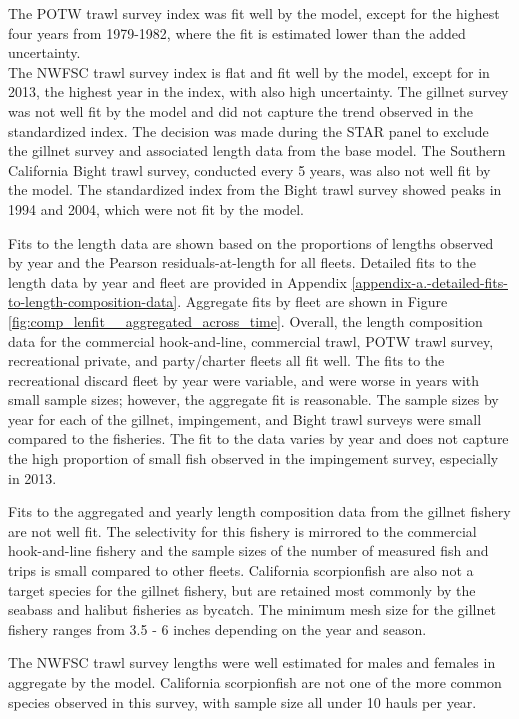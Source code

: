 \documentclass[12pt,]{article}
\begin{document}
The POTW trawl survey index was fit well by the model, except for the
highest four years from 1979-1982, where the fit is estimated lower than
the added uncertainty.\\
The NWFSC trawl survey index is flat and fit well by the model, except
for in 2013, the highest year in the index, with also high uncertainty.
The gillnet survey was not well fit by the model and did not capture the
trend observed in the standardized index. The decision was made during
the STAR panel to exclude the gillnet survey and associated length data
from the base model. The Southern California Bight trawl survey,
conducted every 5 years, was also not well fit by the model. The
standardized index from the Bight trawl survey showed peaks in 1994 and
2004, which were not fit by the model.

Fits to the length data are shown based on the proportions of lengths
observed by year and the Pearson residuals-at-length for all fleets.
Detailed fits to the length data by year and fleet are provided in
Appendix \ref{appendix-a.-detailed-fits-to-length-composition-data}.
Aggregate fits by fleet are shown in Figure
\ref{fig:comp_lenfit__aggregated_across_time}. Overall, the length
composition data for the commercial hook-and-line, commercial trawl,
POTW trawl survey, recreational private, and party/charter fleets all
fit well. The fits to the recreational discard fleet by year were
variable, and were worse in years with small sample sizes; however, the
aggregate fit is reasonable. The sample sizes by year for each of the
gillnet, impingement, and Bight trawl surveys were small compared to the
fisheries. The fit to the data varies by year and does not capture the
high proportion of small fish observed in the impingement survey,
especially in 2013.

Fits to the aggregated and yearly length composition data from the
gillnet fishery are not well fit. The selectivity for this fishery is
mirrored to the commercial hook-and-line fishery and the sample sizes of
the number of measured fish and trips is small compared to other fleets.
California scorpionfish are also not a target species for the gillnet
fishery, but are retained most commonly by the seabass and halibut
fisheries as bycatch. The minimum mesh size for the gillnet fishery
ranges from 3.5 - 6 inches depending on the year and season.

The NWFSC trawl survey lengths were well estimated for males and females
in aggregate by the model. California scorpionfish are not one of the
more common species observed in this survey, with sample size all under
10 hauls per year.
\end{document}
